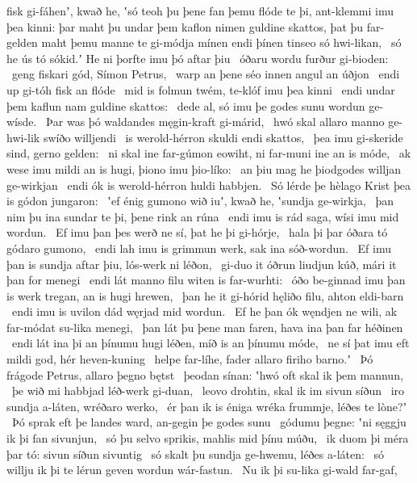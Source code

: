 fisk gi-fáhenʼ, kwað he, ʽsó teoh þu þene fan þemu flóde te þi,
ant-klemmi imu þea kinni: þar maht þu undar þem kaflon nimen
guldine skattos, þat þu far-gelden maht
þemu manne te gi-módja mínen endi þínen
tinseo só hwi-likan, \hld\ só he ús tó sókid.ʼ
He ni þorfte imu þó aftar þiu \hld\ óðaru wordu
furður gi-bioden: \hld\ geng fiskari gód,
Símon Petrus, \hld\ warp an þene séo innen
angul an úðjon \hld\ endi up gi-tóh
fisk an flóde \hld\ mid is folmun twém,
te-klóf imu þea kinni \hld\ endi undar þem kaflun nam
guldine skattos: \hld\ dede al, só imu þe godes sunu
wordun ge-wísde. \hld\ Þar was þó waldandes
męgin-kraft gi-márid, \hld\ hwó skal allaro manno ge-hwi-lik
swíðo willjendi \hld\ is werold-hérron
skuldi endi skattos, \hld\ þea imu gi-skeride sind,
gerno gelden: \hld\ ni skal ine far-gúmon eowiht,
ni far-muni ine an is móde, \hld\ ak wese imu mildi an is hugi,
þiono imu þio-líko: \hld\ an þiu mag he þiodgodes
willjan ge-wirkjan \hld\ endi ók is werold-hérron
huldi habbjen. \hld\ Só lérde þe hèlago Krist
þea is gódon jungaron: \hld\ ʽef énig gumono wið iuʼ, kwað he,
ʽsundja ge-wirkja, \hld\ þan nim þu ina sundar te þi,
þene rink an rúna \hld\ endi imu is rád saga,
wísi imu mid wordun. \hld\ Ef imu þan þes werð ne sí,
þat he þi gi-hórje, \hld\ hala þi þar óðara tó
gódaro gumono, \hld\ endi lah imu is grimmun werk,
sak ina sóð-wordun. \hld\ Ef imu þan is sundja aftar þiu,
lós-werk ni léðon, \hld\ gi-duo it óðrun liudjun kúð,
mári it þan for menegi \hld\ endi lát manno filu
witen is far-wurhti: \hld\ óðo be-ginnad imu þan is werk tregan,
an is hugi hrewen, \hld\ þan he it gi-hórid hęliðo filu,
ahton eldi-barn \hld\ endi imu is uvilon dád
węrjad mid wordun. \hld\ Ef he þan ók węndjen ne wili,
ak far-módat su-lika menegi, \hld\ þan lát þu þene man faren,
hava ina þan far héðinen \hld\ endi lát ina þi an þínumu hugi léðen,
míð is an þínumu móde, \hld\ ne sí þat imu eft mildi god,
hér heven-kuning \hld\ helpe far-líhe,
fader allaro firiho barno.ʼ \hld\ Þó frágode Petrus,
allaro þegno bętst \hld\ þeodan sínan:
ʽhwó oft skal ik þem mannun, \hld\ þe wið mi habbjad
léð-werk gi-duan, \hld\ leovo drohtin,
skal ik im sivun síðun \hld\ iro sundja a-láten,
wréðaro werko, \hld\ ér þan ik is éniga wréka frummje,
léðes te lòne?ʼ \hld\ Þó sprak eft þe landes ward,
an-gegin þe godes sunu \hld\ gódumu þegne:
ʽni sęggju ik þi fan sivunjun, \hld\ só þu selvo sprikis,
mahlis mid þínu múðu, \hld\ ik duom þi méra þar tó:
sivun síðun sivuntig \hld\ só skalt þu sundja ge-hwemu,
léðes a-láten: \hld\ só willju ik þi te lérun geven
wordun wár-fastun. \hld\ Nu ik þi su-lika gi-wald far-gaf,
